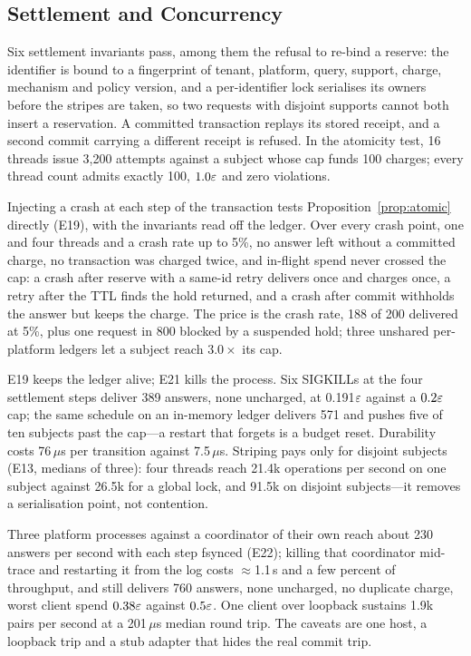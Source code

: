 \subsection{Settlement and Concurrency}
\label{sec:eval-concurrency}

Six settlement invariants pass, among them the refusal to re-bind a reserve: the
identifier is bound to a fingerprint of tenant, platform, query, support, charge,
mechanism and policy version, and a per-identifier lock serialises its owners before the
stripes are taken, so two requests with disjoint supports cannot both insert a
reservation. A committed transaction replays its stored receipt, and a second commit
carrying a different receipt is refused. In the atomicity test, 16 threads issue 3{,}200
attempts against a subject whose cap funds 100 charges; every thread count admits exactly
100, $1.0\varepsilon$ and zero violations.

Injecting a crash at each step of the transaction tests Proposition~\ref{prop:atomic}
directly (E19), with the invariants read off the ledger. Over every crash point, one and
four threads and a crash rate up to 5\%, no answer left without a committed charge, no
transaction was charged twice, and in-flight spend never crossed the cap: a crash after
reserve with a same-id retry delivers once and charges once, a retry after the TTL finds
the hold returned, and a crash after commit withholds the answer but keeps the charge.
The price is the crash rate, 188 of 200 delivered at 5\%, plus one request in 800 blocked
by a suspended hold; three unshared per-platform ledgers let a subject reach
$3.0\times$ its cap.

E19 keeps the ledger alive; E21 kills the process. Six SIGKILLs at the four settlement
steps deliver 389 answers, none uncharged, at 0.191$\varepsilon$ against a $0.2\varepsilon$ cap; the
same schedule on an in-memory ledger delivers 571 and pushes five of ten subjects past
the cap---a restart that forgets is a budget reset. Durability costs 76\,$\mu$s per
transition against 7.5\,$\mu$s. Striping pays only for disjoint subjects (E13, medians of
three): four threads reach 21.4k operations per second on one subject against 26.5k for a
global lock, and 91.5k on disjoint subjects---it removes a serialisation point, not
contention.

Three platform processes against a coordinator of their own reach about 230 answers per
second with each step fsynced (E22); killing that coordinator mid-trace and restarting it
from the log costs $\approx$1.1\,s and a few percent of throughput, and still delivers
760 answers, none uncharged, no duplicate charge, worst client spend $0.38\varepsilon$ against
$0.5\varepsilon$. One client over loopback sustains 1.9k pairs per second at a 201\,$\mu$s
median round trip. The caveats are one host, a loopback trip and a stub adapter that hides
the real commit trip.
